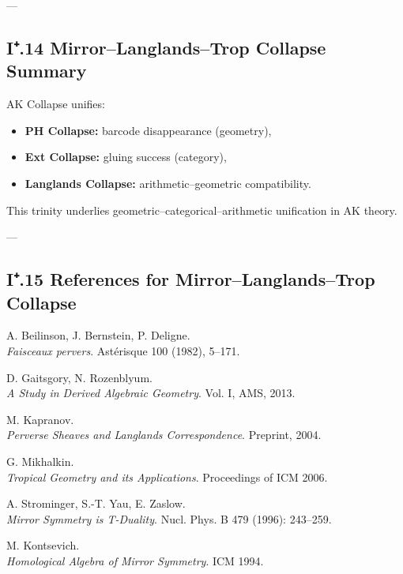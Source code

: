 \documentclass[11pt]{article}
\begin{document}
---

\subsection*{I⁺.14 Mirror–Langlands–Trop Collapse Summary}

AK Collapse unifies:

\begin{itemize}
  \item \textbf{PH Collapse:} barcode disappearance (geometry),
  \item \textbf{Ext Collapse:} gluing success (category),
  \item \textbf{Langlands Collapse:} arithmetic–geometric compatibility.
\end{itemize}

This trinity underlies geometric–categorical–arithmetic unification in AK theory.

---

\subsection*{I⁺.15 References for Mirror–Langlands–Trop Collapse}

\begin{thebibliography}{9}

A. Beilinson, J. Bernstein, P. Deligne.\\
\textit{Faisceaux pervers}. Astérisque 100 (1982), 5–171.

D. Gaitsgory, N. Rozenblyum.\\
\textit{A Study in Derived Algebraic Geometry}.  
Vol. I, AMS, 2013.

M. Kapranov.\\
\textit{Perverse Sheaves and Langlands Correspondence}.  
Preprint, 2004.

G. Mikhalkin.\\
\textit{Tropical Geometry and its Applications}.  
Proceedings of ICM 2006.

A. Strominger, S.-T. Yau, E. Zaslow.\\
\textit{Mirror Symmetry is T-Duality}.  
Nucl. Phys. B 479 (1996): 243–259.

M. Kontsevich.\\
\textit{Homological Algebra of Mirror Symmetry}.  
ICM 1994.

\end{thebibliography}
\end{document}
